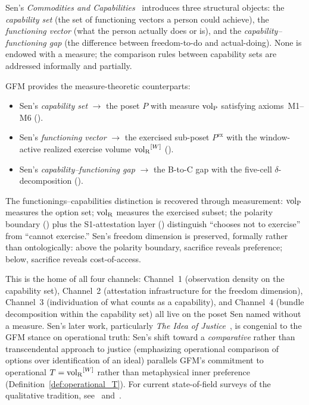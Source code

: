 Sen's \emph{Commodities and
Capabilities}~\citep{sen1985commodities} introduces three
structural objects: the \emph{capability set} (the set of
functioning vectors a person could achieve), the \emph{functioning
vector} (what the person actually does or is), and the
\emph{capability--functioning gap} (the difference between
freedom-to-do and actual-doing).  None is endowed with a measure;
the comparison rules between capability sets are addressed
informally and partially.

GFM provides the measure-theoretic counterparts:
\begin{itemize}
\item Sen's \emph{capability set} $\to$ the poset $P$ with measure
  ${\operatorname{vol}_{\mathrm{P}}}$ satisfying axioms~M1--M6
  (\citep[Proposition~1]{lasser2026poset}).
\item Sen's \emph{functioning vector} $\to$ the exercised
  sub-poset $P^{\mathrm{ex}}$ with the window-active realized
  exercise volume ${\operatorname{vol}_{\mathrm{R}}}^{[W]}$
  (\citep[Definition~3]{lasser2026paper8a}).
\item Sen's \emph{capability--functioning gap} $\to$ the B-to-C
  gap with the five-cell $\delta$-decomposition
  (\citep[Definition~8]{lasser2026paper8b}).
\end{itemize}
The functionings--capabilities distinction is recovered through
measurement: ${\operatorname{vol}_{\mathrm{P}}}$ measures the option set; ${\operatorname{vol}_{\mathrm{R}}}$ measures the
exercised subset; the polarity boundary
(\citep[Definition~3]{lasser2026paper8b}) plus the
S1-attestation layer (\citep[Remark~18]{lasser2026paper8a})
distinguish ``chooses not to exercise'' from ``cannot exercise.''
Sen's freedom dimension is preserved, formally rather than
ontologically: above the polarity boundary, sacrifice reveals
preference; below, sacrifice reveals cost-of-access.

This is the home of all four channels: Channel~1 (observation
density on the capability set), Channel~2 (attestation
infrastructure for the freedom dimension), Channel~3
(individuation of what counts as a capability), and Channel~4
(bundle decomposition within the capability set) all live on the
poset Sen named without a measure.  Sen's later work,
particularly \emph{The Idea of Justice}~\citep{sen2009idea}, is
congenial to the GFM stance on operational truth: Sen's shift
toward a \emph{comparative} rather than transcendental approach
to justice (emphasizing operational comparison of options over
identification of an ideal) parallels GFM's commitment to
operational $T = {\operatorname{vol}_{\mathrm{R}}}^{[W]}$ rather than metaphysical inner
preference (Definition~\ref{def:operational_T}).  For current
state-of-field surveys of the qualitative tradition,
see~\citep{robeyns2017wellbeing} and~\citep{chiappero2020cambridge}.

